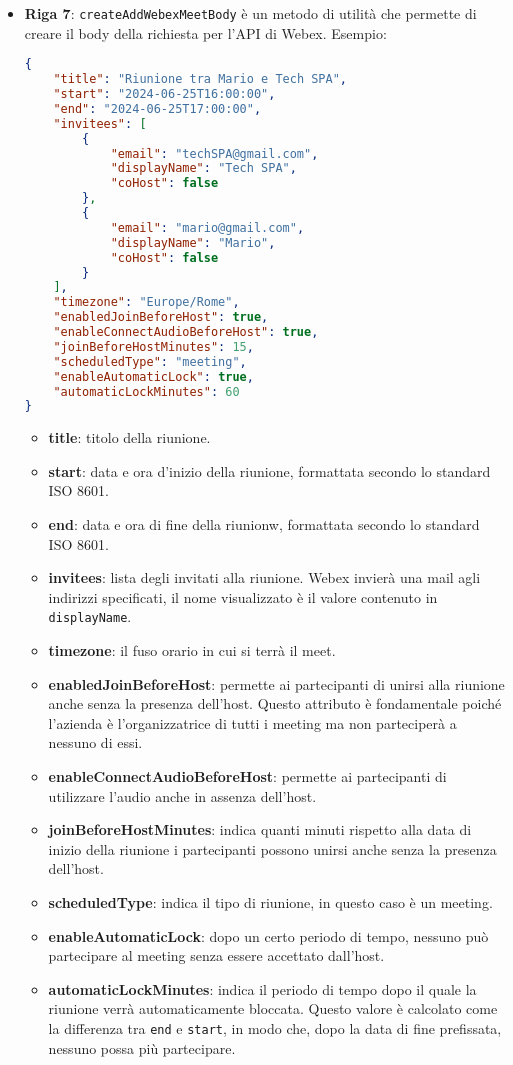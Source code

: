 \begin{itemize}
    \item \textbf{Riga 7}: \texttt{createAddWebexMeetBody} è un metodo di utilità che permette di creare il body
    della richiesta per l'API di Webex. Esempio:
    \begin{lstlisting}[language=json,firstnumber=1]
{
    "title": "Riunione tra Mario e Tech SPA",
    "start": "2024-06-25T16:00:00",
    "end": "2024-06-25T17:00:00",
    "invitees": [
        {
            "email": "techSPA@gmail.com",
            "displayName": "Tech SPA",
            "coHost": false
        },
        {
            "email": "mario@gmail.com",
            "displayName": "Mario",
            "coHost": false
        }
    ],
    "timezone": "Europe/Rome",
    "enabledJoinBeforeHost": true,
    "enableConnectAudioBeforeHost": true,
    "joinBeforeHostMinutes": 15,
    "scheduledType": "meeting",
    "enableAutomaticLock": true,
    "automaticLockMinutes": 60
}
    \end{lstlisting}
    \begin{itemize}
        \item \textbf{title}: titolo della riunione.
        \item \textbf{start}: data e ora d'inizio della riunione, formattata secondo lo standard ISO 8601.
        \item \textbf{end}: data e ora di fine della riunionw, formattata secondo lo standard ISO 8601.
        \item \textbf{invitees}: lista degli invitati alla riunione. Webex invierà una mail agli indirizzi specificati, il nome
        visualizzato è il valore contenuto in \texttt{displayName}.
        \item \textbf{timezone}: il fuso orario in cui si terrà il meet.
        \item \textbf{enabledJoinBeforeHost}: permette ai partecipanti di unirsi alla riunione anche senza la presenza dell'host. 
        Questo attributo è fondamentale poiché l'azienda è l'organizzatrice di tutti i meeting ma non parteciperà a nessuno di essi.
        \item \textbf{enableConnectAudioBeforeHost}: permette ai partecipanti di utilizzare l'audio anche in assenza dell'host.
        \item \textbf{joinBeforeHostMinutes}: indica quanti minuti rispetto alla data di inizio della riunione i partecipanti possono unirsi anche senza la presenza dell'host.
        \item \textbf{scheduledType}: indica il tipo di riunione, in questo caso è un meeting.
        \item \textbf{enableAutomaticLock}: dopo un certo periodo di tempo, nessuno può partecipare al meeting senza essere accettato dall'host.
        \item \textbf{automaticLockMinutes}: indica il periodo di tempo dopo il quale la riunione verrà automaticamente bloccata. 
        Questo valore è calcolato come la differenza tra \texttt{end} e \texttt{start}, in modo che, dopo la data di fine prefissata, 
        nessuno possa più partecipare.
    \end{itemize}


\end{itemize}
